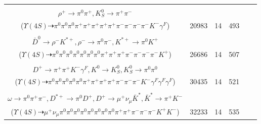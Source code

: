 \documentclass[landscape]{article}
\newcounter{rownumbers}
\newcommand\rn{\stepcounter{rownumbers}\arabic{rownumbers}}
\newcommand{\EOLP}{\\ \hline} %
\newcommand{\topoTags}[1]{#1} %
\begin{document}
\begin{longtable}{clcccc}
\rn & \makecell[l]{ $ 
\Upsilon(4S) \rightarrow B^{0} \bar{B}^{0} ,
B^{0} \rightarrow \pi^{0} \pi^{+} \pi^{+} \pi^{-} D^{*-} \gamma^{F} ,
\bar{B}^{0} \rightarrow K^{-} a_{1}^{+} ,
D^{*-} \rightarrow \pi^{-} \bar{D}^{0} ,
a_{1}^{+} \rightarrow \pi^{0} \rho^{+} ,
\bar{D}^{0} \rightarrow \pi^{+} \pi^{-} K_{S}^{0} ,
$ \\ $
\rho^{+} \rightarrow \pi^{0} \pi^{+} ,
K_{S}^{0} \rightarrow \pi^{+} \pi^{-} 
$ \\ ($
\Upsilon(4S) \dashrightarrow \pi^{0} \pi^{0} \pi^{0} \pi^{+} \pi^{+} \pi^{+} \pi^{+} \pi^{+} \pi^{-} \pi^{-} \pi^{-} \pi^{-} K^{-} \gamma^{F} 
$) } & \topoTags{20983 & }14 & 493 \EOLP

\rn & \makecell[l]{ $ 
\Upsilon(4S) \rightarrow B^{0} \bar{B}^{0} ,
B^{0} \rightarrow \pi^{0} \rho^{0} \pi^{+} \eta D^{*-} ,
\bar{B}^{0} \rightarrow \pi^{0} \pi^{+} \pi^{-} ,
\rho^{0} \rightarrow \pi^{+} \pi^{-} ,
\eta \rightarrow \pi^{0} \pi^{0} \pi^{0} ,
D^{*-} \rightarrow \pi^{-} \bar{D}^{0} ,
$ \\ $
\bar{D}^{0} \rightarrow \rho^{-} K^{*+} ,
\rho^{-} \rightarrow \pi^{0} \pi^{-} ,
K^{*+} \rightarrow \pi^{0} K^{+} 
$ \\ ($
\Upsilon(4S) \dashrightarrow \pi^{0} \pi^{0} \pi^{0} \pi^{0} \pi^{0} \pi^{0} \pi^{0} \pi^{+} \pi^{+} \pi^{+} \pi^{-} \pi^{-} \pi^{-} \pi^{-} K^{+} 
$) } & \topoTags{26686 & }14 & 507 \EOLP

\rn & \makecell[l]{ $ 
\Upsilon(4S) \rightarrow B^{0} \bar{B}^{0} ,
B^{0} \rightarrow \pi^{-} K^{*}(1680)^{+} ,
\bar{B}^{0} \rightarrow \pi^{0} \pi^{0} \rho^{0} \rho^{-} D^{+} ,
K^{*}(1680)^{+} \rightarrow \pi^{+} K^{0} ,
\rho^{0} \rightarrow \pi^{+} \pi^{-} \gamma^{F} \gamma^{F} ,
\rho^{-} \rightarrow \pi^{0} \pi^{-} ,
$ \\ $
D^{+} \rightarrow \pi^{+} \pi^{+} K^{-} \gamma^{F} ,
K^{0} \rightarrow K_{S}^{0} ,
K_{S}^{0} \rightarrow \pi^{0} \pi^{0} 
$ \\ ($
\Upsilon(4S) \dashrightarrow \pi^{0} \pi^{0} \pi^{0} \pi^{0} \pi^{0} \pi^{+} \pi^{+} \pi^{+} \pi^{+} \pi^{-} \pi^{-} \pi^{-} K^{-} \gamma^{F} \gamma^{F} \gamma^{F} 
$) } & \topoTags{30435 & }14 & 521 \EOLP

\rn & \makecell[l]{ $ 
\Upsilon(4S) \rightarrow B^{0} \bar{B}^{0} ,
B^{0} \rightarrow \pi^{-} K_{0}^{*+} ,
\bar{B}^{0} \rightarrow \pi^{0} \rho^{-} \eta \omega D^{*+} ,
K_{0}^{*+} \rightarrow \pi^{0} K^{+} ,
\rho^{-} \rightarrow \pi^{0} \pi^{-} ,
\eta \rightarrow \pi^{0} \pi^{0} \pi^{0} ,
$ \\ $
\omega \rightarrow \pi^{0} \pi^{+} \pi^{-} ,
D^{*+} \rightarrow \pi^{0} D^{+} ,
D^{+} \rightarrow \mu^{+} \nu_{\mu} \bar{K}^{*} ,
\bar{K}^{*} \rightarrow \pi^{+} K^{-} 
$ \\ ($
\Upsilon(4S) \dashrightarrow \mu^{+} \nu_{\mu} \pi^{0} \pi^{0} \pi^{0} \pi^{0} \pi^{0} \pi^{0} \pi^{0} \pi^{0} \pi^{+} \pi^{+} \pi^{-} \pi^{-} \pi^{-} K^{+} K^{-} 
$) } & \topoTags{32233 & }14 & 535 \EOLP


\end{longtable}
\end{document}
